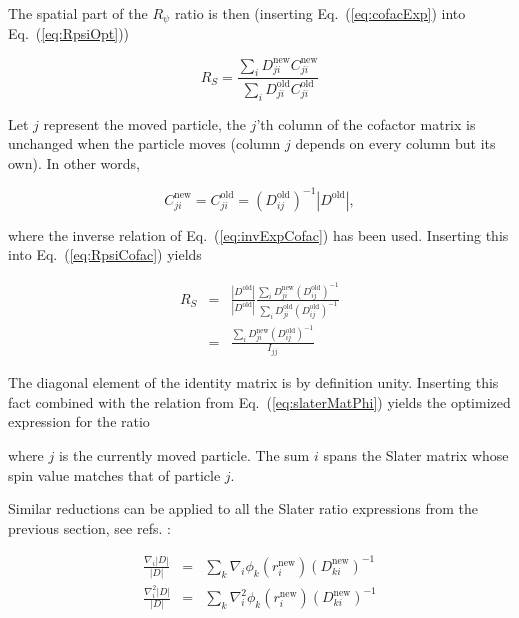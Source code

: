 The spatial part of the $R_\psi$ ratio is then (inserting Eq.~(\ref{eq:cofacExp}) into Eq.~(\ref{eq:RpsiOpt}))

\begin{equation}
\label{eq:RpsiCofac}
 R_S = \frac{\sum_i D_{ji}^\mathrm{new}C_{ji}^\mathrm{new}}{\sum_i D_{ji}^\mathrm{old}C_{ji}^\mathrm{old}}
\end{equation}

Let $j$ represent the moved particle, the $j$'th column of the cofactor matrix is unchanged when the particle moves (column $j$ depends on every column but its own). In other words,

\begin{equation}
 C_{ji}^\mathrm{new} = C_{ji}^\mathrm{old} = (D^\mathrm{old}_{ij})^{-1}|D^\mathrm{old}|,
\end{equation}

where the inverse relation of Eq.~(\ref{eq:invExpCofac}) has been used. Inserting this into Eq.~(\ref{eq:RpsiCofac}) yields

\begin{eqnarray}
  R_S &=& \frac{|D^\mathrm{old}|}{|D^\mathrm{old}|}\frac{\sum_i D_{ji}^\mathrm{new}(D_{ij}^\mathrm{old})^{-1}}{\sum_i D_{ji}^\mathrm{old}(D_{ij}^\mathrm{old})^{-1}} \nonumber\\
         &=& \frac{\sum_i D_{ji}^\mathrm{new}(D_{ij}^\mathrm{old})^{-1}}{I_{jj}} \nonumber
\end{eqnarray}

The diagonal element of the identity matrix is by definition unity. Inserting this fact combined with the relation from Eq.~(\ref{eq:slaterMatPhi}) yields the optimized expression for the ratio


where $j$ is the currently moved particle. The sum $i$ spans the Slater matrix whose spin value matches that of particle $j$.


Similar reductions can be applied to all the Slater ratio expressions from the previous section, see refs. \cite{abInitioMC, morten}:

\begin{eqnarray}
 \frac{\nabla_i|D|}{|D|} &=& \sum_{k} \nabla_i\phi_k(r_i^\mathrm{new})(D_{ki}^\mathrm{new})^{-1} \\
  \frac{\nabla_i^2|D|}{|D|} &=& \sum_{k} \nabla_i^2\phi_k(r_i^\mathrm{new})(D_{ki}^\mathrm{new})^{-1}
\end{eqnarray}

